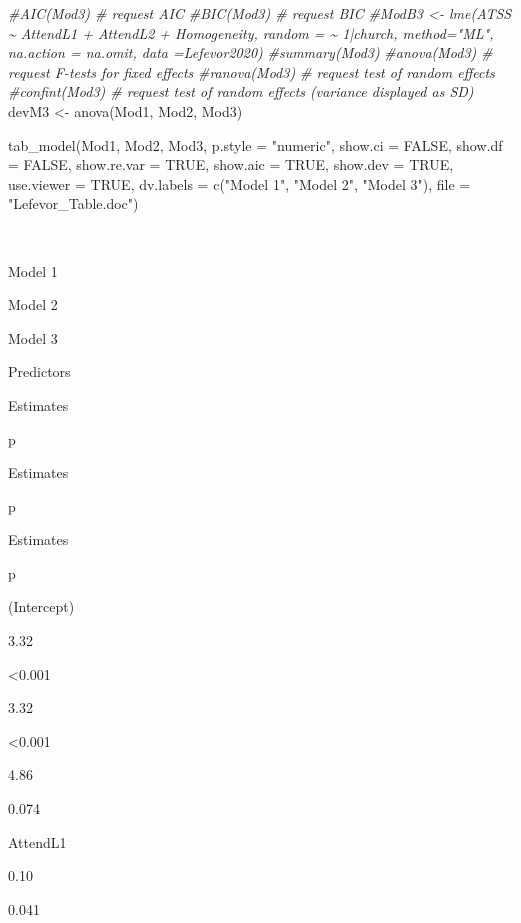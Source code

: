 \documentclass[
  11pt,
]{book}
\newenvironment{Shaded}{\begin{snugshade}}{\end{snugshade}}
\newcommand{\AttributeTok}[1]{\textcolor[rgb]{0.77,0.63,0.00}{#1}}
\newcommand{\CommentTok}[1]{\textcolor[rgb]{0.56,0.35,0.01}{\textit{#1}}}
\newcommand{\ConstantTok}[1]{\textcolor[rgb]{0.00,0.00,0.00}{#1}}
\newcommand{\FunctionTok}[1]{\textcolor[rgb]{0.00,0.00,0.00}{#1}}
\newcommand{\NormalTok}[1]{#1}
\newcommand{\OtherTok}[1]{\textcolor[rgb]{0.56,0.35,0.01}{#1}}
\newcommand{\StringTok}[1]{\textcolor[rgb]{0.31,0.60,0.02}{#1}}
\begin{document}
\begin{Shaded}
\begin{Highlighting}[]
\CommentTok{\#AIC(Mod3) \# request AIC}
\CommentTok{\#BIC(Mod3) \# request BIC}
\CommentTok{\#ModB3 \textless{}{-} lme(ATSS \textasciitilde{}  AttendL1 +  AttendL2 + Homogeneity, random = \textasciitilde{} 1|church, method="ML", na.action = na.omit, data =Lefevor2020)}
\CommentTok{\#summary(Mod3)}
\CommentTok{\#anova(Mod3) \# request F{-}tests for fixed effects}
\CommentTok{\#ranova(Mod3) \# request test of random effects}
\CommentTok{\#confint(Mod3) \# request test of random effects (variance displayed as SD)}
\NormalTok{devM3 }\OtherTok{\textless{}{-}} \FunctionTok{anova}\NormalTok{(Mod1, Mod2, Mod3) }

\FunctionTok{tab\_model}\NormalTok{(Mod1, Mod2, Mod3, }\AttributeTok{p.style =} \StringTok{"numeric"}\NormalTok{, }\AttributeTok{show.ci =} \ConstantTok{FALSE}\NormalTok{, }\AttributeTok{show.df =} \ConstantTok{FALSE}\NormalTok{, }\AttributeTok{show.re.var =} \ConstantTok{TRUE}\NormalTok{, }\AttributeTok{show.aic =} \ConstantTok{TRUE}\NormalTok{, }\AttributeTok{show.dev =} \ConstantTok{TRUE}\NormalTok{, }\AttributeTok{use.viewer =} \ConstantTok{TRUE}\NormalTok{, }\AttributeTok{dv.labels =} \FunctionTok{c}\NormalTok{(}\StringTok{"Model 1"}\NormalTok{, }\StringTok{"Model 2"}\NormalTok{, }\StringTok{"Model 3"}\NormalTok{), }\AttributeTok{file =} \StringTok{"Lefevor\_Table.doc"}\NormalTok{)}
\end{Highlighting}
\end{Shaded}

~

Model 1

Model 2

Model 3

Predictors

Estimates

p

Estimates

p

Estimates

p

(Intercept)

3.32

\textless0.001

3.32

\textless0.001

4.86

0.074

AttendL1

0.10

0.041
\end{document}
